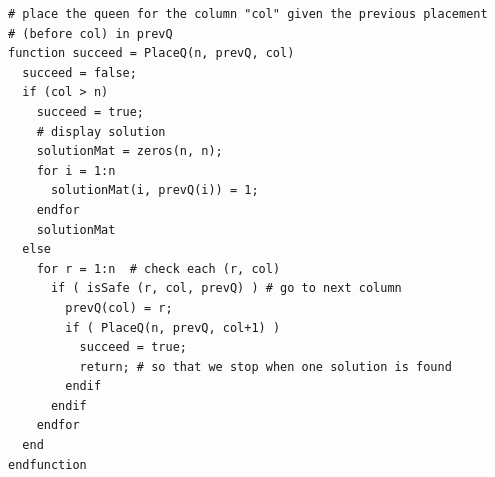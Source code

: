 \documentclass[12pt,a4paper,hidelinks,fleqn]{article}            %
\begin{document}
\begin{verbatim}
# place the queen for the column "col" given the previous placement
# (before col) in prevQ                                                    
function succeed = PlaceQ(n, prevQ, col)                                                                                                     
  succeed = false;                                                                                                                           
  if (col > n)                                                                                                                               
    succeed = true;                                                                                                                          
    # display solution                                                                                                                       
    solutionMat = zeros(n, n);                                                                                                               
    for i = 1:n                                                                                                                              
      solutionMat(i, prevQ(i)) = 1;                                                                                                          
    endfor                                                                                                                                   
    solutionMat                                                                                                                              
  else                                                                                                                                       
    for r = 1:n  # check each (r, col)                                                                                                       
      if ( isSafe (r, col, prevQ) ) # go to next column                                                                                      
        prevQ(col) = r;                                                                                                                      
        if ( PlaceQ(n, prevQ, col+1) )  
          succeed = true;
          return; # so that we stop when one solution is found                                                                               
        endif                                                                                                                                
      endif                                                                                                                                  
    endfor                                                                                                                                   
  end                                                                                                                                        
endfunction           
\end{verbatim}
\end{document}
